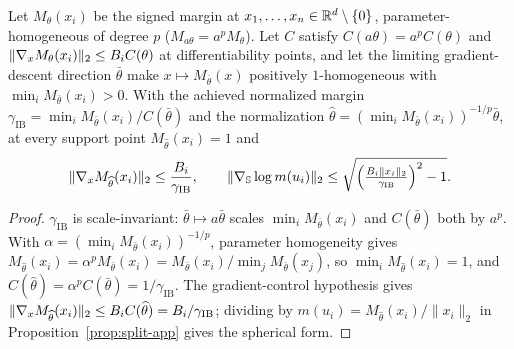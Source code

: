 \begin{proposition}\label{prop:ib-envelope-app}
Let $M_\theta(x_i)$ be the signed margin at $x_1,\dots,x_n\in\mathbb{R}^d\setminus\{0\}$,
parameter-homogeneous of degree $p$ ($M_{a\theta}=a^pM_\theta$). Let $C$ satisfy
$C(a\theta)=a^pC(\theta)$ and $\lVert\nabla_xM_\theta(x_i)\rVert_2\le B_iC(\theta)$
at differentiability points, and let the limiting gradient-descent direction
$\bar\theta$ make $x\mapsto M_{\bar\theta}(x)$ positively $1$-homogeneous with
$\min_iM_{\bar\theta}(x_i)>0$. With the achieved normalized margin
$\gamma_{\mathrm{IB}}=\min_iM_{\bar\theta}(x_i)/C(\bar\theta)$ and the
normalization $\widehat\theta=(\min_iM_{\bar\theta}(x_i))^{-1/p}\bar\theta$, at
every support point $M_{\widehat\theta}(x_i)=1$ and
\[
\lVert\nabla_xM_{\widehat\theta}(x_i)\rVert_2\le\frac{B_i}{\gamma_{\mathrm{IB}}},\qquad
\lVert\nabla_{\mathbb S}\log m(u_i)\rVert_2\le\sqrt{\Big(\tfrac{B_i\lVert x_i\rVert_2}{\gamma_{\mathrm{IB}}}\Big)^2-1}.
\]
\end{proposition}
\begin{proof}
$\gamma_{\mathrm{IB}}$ is scale-invariant: $\bar\theta\mapsto a\bar\theta$ scales
$\min_iM_{\bar\theta}(x_i)$ and $C(\bar\theta)$ both by $a^p$. With
$\alpha=(\min_iM_{\bar\theta}(x_i))^{-1/p}$, parameter homogeneity gives
$M_{\widehat\theta}(x_i)=\alpha^pM_{\bar\theta}(x_i)=M_{\bar\theta}(x_i)/\min_jM_{\bar\theta}(x_j)$,
so $\min_iM_{\widehat\theta}(x_i)=1$, and
$C(\widehat\theta)=\alpha^pC(\bar\theta)=1/\gamma_{\mathrm{IB}}$. The
gradient-control hypothesis gives
$\lVert\nabla_xM_{\widehat\theta}(x_i)\rVert_2\le B_iC(\widehat\theta)=B_i/\gamma_{\mathrm{IB}}$;
dividing by $m(u_i)=M_{\widehat\theta}(x_i)/\lVert x_i\rVert_2$ in
Proposition~\ref{prop:split-app} gives the spherical form.
\end{proof}

